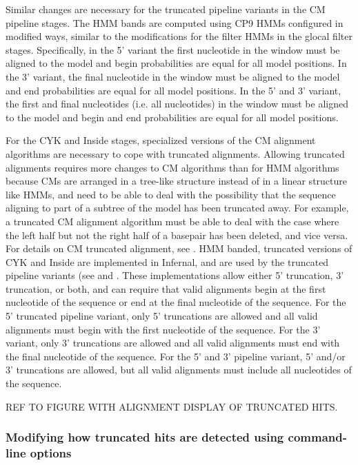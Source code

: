 \begin{sreoutput}
Similar changes are necessary for the truncated pipeline variants in
the CM pipeline stages. The HMM bands are computed using CP9 HMMs
configured in modified ways, similar to the modifications for the
filter HMMs in the glocal filter stages. Specifically, in the 5'
variant the first nucleotide in the window must be aligned to the
model and begin probabilities are equal for all model positions. In
the 3' variant, the final nucleotide in the window must be aligned to
the model and end probabilities are equal for all model positions. In
the 5' and 3' variant, the first and final nucleotides (i.e. all
nucleotides) in the window must be aligned to the model and begin and
end probabilities are equal for all model positions.

For the CYK and Inside stages, specialized versions of the CM
alignment algorithms are necessary to cope with truncated
alignments. Allowing truncated alignments requires more changes to CM
algorithms than for HMM algorithms because CMs are arranged in a
tree-like structure instead of in a linear structure like HMMs, and
need to be able to deal with the possibility that the sequence
aligning to part of a subtree of the model has been truncated
away. For example, a truncated CM alignment algorithm must be able to
deal with the case where the left half but not the right half of a
basepair has been deleted, and vice versa. For details on CM truncated
alignment, see \cite{KolbeEddy08}. HMM banded, truncated versions of
CYK and Inside are implemented in Infernal, and are used by the
truncated pipeline variants (see  and
. These implementations allow either 5'
truncation, 3' truncation, or both, and can require that valid
alignments begin at the first nucleotide of the sequence or end at the
final nucleotide of the sequence.  For the 5' truncated pipeline
variant, only 5' truncations are allowed and all valid alignments must
begin with the first nucleotide of the sequence. For the 3' variant,
only 3' truncations are allowed and all valid alignments must end with
the final nucleotide of the sequence. For the 5' and 3' pipeline
variant, 5' and/or 3' truncations are allowed, but all valid
alignments must include all nucleotides of the sequence.

REF TO FIGURE WITH ALIGNMENT DISPLAY OF TRUNCATED HITS.

\subsubsection{Modifying how truncated hits are detected using
  command-line options}


\end{sreoutput}
